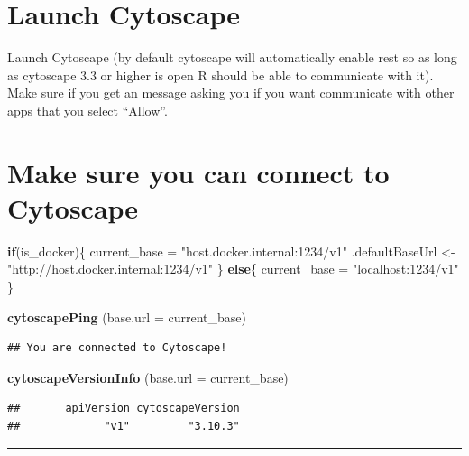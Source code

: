 \documentclass[
]{book}
\newenvironment{Shaded}{\begin{snugshade}}{\end{snugshade}}
\newcommand{\AttributeTok}[1]{\textcolor[rgb]{0.13,0.29,0.53}{#1}}
\newcommand{\ControlFlowTok}[1]{\textcolor[rgb]{0.13,0.29,0.53}{\textbf{#1}}}
\newcommand{\FunctionTok}[1]{\textcolor[rgb]{0.13,0.29,0.53}{\textbf{#1}}}
\newcommand{\NormalTok}[1]{#1}
\newcommand{\OtherTok}[1]{\textcolor[rgb]{0.56,0.35,0.01}{#1}}
\newcommand{\StringTok}[1]{\textcolor[rgb]{0.31,0.60,0.02}{#1}}
\begin{document}
\section{Launch Cytoscape}\label{launch-cytoscape}

Launch Cytoscape (by default cytoscape will automatically enable rest so as long as cytoscape 3.3 or higher is open R should be able to communicate with it). Make sure if you get an message asking you if you want communicate with other apps that you select ``Allow''.

\section{Make sure you can connect to Cytoscape}\label{make-sure-you-can-connect-to-cytoscape}

\begin{Shaded}
\begin{Highlighting}[]
\ControlFlowTok{if}\NormalTok{(is\_docker)\{}
\NormalTok{  current\_base }\OtherTok{=} \StringTok{"host.docker.internal:1234/v1"}
\NormalTok{  .defaultBaseUrl }\OtherTok{\textless{}{-}} \StringTok{"http://host.docker.internal:1234/v1"}
\NormalTok{\} }\ControlFlowTok{else}\NormalTok{\{}
\NormalTok{  current\_base }\OtherTok{=} \StringTok{"localhost:1234/v1"}
\NormalTok{\}}

\FunctionTok{cytoscapePing}\NormalTok{ (}\AttributeTok{base.url =}\NormalTok{ current\_base)}
\end{Highlighting}
\end{Shaded}

\begin{verbatim}
## You are connected to Cytoscape!
\end{verbatim}

\begin{Shaded}
\begin{Highlighting}[]
\FunctionTok{cytoscapeVersionInfo}\NormalTok{ (}\AttributeTok{base.url =}\NormalTok{ current\_base)}
\end{Highlighting}
\end{Shaded}

\begin{verbatim}
##       apiVersion cytoscapeVersion 
##             "v1"         "3.10.3"
\end{verbatim}

\begin{center}\rule{0.5\linewidth}{0.5pt}\end{center}
\end{document}
